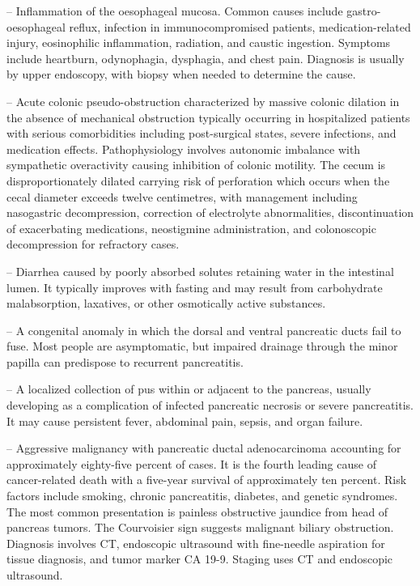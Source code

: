 -- Inflammation of the oesophageal mucosa. Common causes include gastro-oesophageal reflux, infection in immunocompromised patients, medication-related injury, eosinophilic inflammation, radiation, and caustic ingestion. Symptoms include heartburn, odynophagia, dysphagia, and chest pain. Diagnosis is usually by upper endoscopy, with biopsy when needed to determine the cause.

-- Acute colonic pseudo-obstruction characterized by massive colonic dilation in the absence of mechanical obstruction typically occurring in hospitalized patients with serious comorbidities including post-surgical states, severe infections, and medication effects. Pathophysiology involves autonomic imbalance with sympathetic overactivity causing inhibition of colonic motility. The cecum is disproportionately dilated carrying risk of perforation which occurs when the cecal diameter exceeds twelve centimetres, with management including nasogastric decompression, correction of electrolyte abnormalities, discontinuation of exacerbating medications, neostigmine administration, and colonoscopic decompression for refractory cases.

-- Diarrhea caused by poorly absorbed solutes retaining water in the intestinal lumen. It typically improves with fasting and may result from carbohydrate malabsorption, laxatives, or other osmotically active substances.

-- A congenital anomaly in which the dorsal and ventral pancreatic ducts fail to fuse. Most people are asymptomatic, but impaired drainage through the minor papilla can predispose to recurrent pancreatitis.

-- A localized collection of pus within or adjacent to the pancreas, usually developing as a complication of infected pancreatic necrosis or severe pancreatitis. It may cause persistent fever, abdominal pain, sepsis, and organ failure.

-- Aggressive malignancy with pancreatic ductal adenocarcinoma accounting for approximately eighty-five percent of cases. It is the fourth leading cause of cancer-related death with a five-year survival of approximately ten percent. Risk factors include smoking, chronic pancreatitis, diabetes, and genetic syndromes. The most common presentation is painless obstructive jaundice from head of pancreas tumors. The Courvoisier sign suggests malignant biliary obstruction. Diagnosis involves CT, endoscopic ultrasound with fine-needle aspiration for tissue diagnosis, and tumor marker CA 19-9. Staging uses CT and endoscopic ultrasound.

